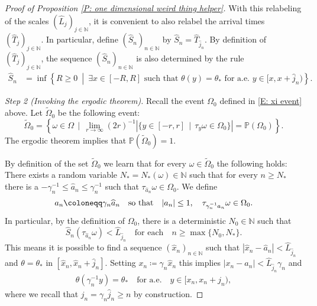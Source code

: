 \documentclass[12pt]{amsart}
\newcommand{\N}{\mathbb{N}}
\begin{document}
\begin{proof}[Proof of Proposition \ref{P: one dimensional weird thing helper}]
With this relabeling of the scales $( \widehat{L}_{j})_{j \in \mathbb{N}}$, it is convenient to also relabel the arrival times $( \widehat{T}_{j})_{j \in \mathbb{N}}$. In particular, define $( \widehat{S}_{n})_{n \in \mathbb{N}}$ by $ \widehat{S}_{n} = \widehat{T}_{\widehat{j}_{n}}$. By definition of $( \widehat{T}_{j} )_{j \in \mathbb{N}}$, the sequence $( \widehat{S}_{n})_{n \in \mathbb{N}}$ is also determined by the rule
	\begin{align} \label{E: arrival time thing}
		\widehat{S}_{n} &= \inf \left\{ R \geq 0 ~ \middle| ~  \exists x \in [-R,R] \, \, \text{such that} \, \, \theta(y) = \theta_{*} \, \,  \text{for a.e.} \, \, y \in [x, x + \widehat{j}_{n}) \right\}.
	\end{align}
	
\textit{Step 2 (Invoking the ergodic theorem).} Recall the event $\Omega_{0}$ defined in \eqref{E: xi event} above. Let $\tilde{\Omega}_{0}$ be the following event:
	\begin{equation*}
		\tilde{\Omega}_{0} = \left\{ \omega \in \Omega \, \mid \,  \lim_{r \to \infty} (2r)^{-1} |\{y \in [ - r, r] \, \mid \, \tau_{y} \omega \in \Omega_0 \}| = \mathbb{P}(\Omega_{0}) \right\}.
	\end{equation*}
The ergodic theorem implies that $\mathbb{P}(\tilde{\Omega}_{0}) = 1$.

By definition of the set $ \tilde\Omega_0 $ we learn that for every $ \omega \in \tilde\Omega_0 $ the following holds: There exists a random variable $ N_* = N_* ( \omega ) \in \mathbb{N}$ such that for every $ n \geq N_* $ there is a $ - \gamma_n^{-1} \leq \widehat{a}_n \leq \gamma_n^{-1} $ such that $ \tau_{ \widehat{a}_n } \omega \in \Omega_0 $. We define
%
\begin{align*}
a_n \coloneqq \gamma_n \widehat{a}_n
\quad { \rm so ~ that } \quad
| a_n | \leq 1,
\quad
\tau_{ \gamma_n^{-1} a_n } \omega \in \Omega_0.
\end{align*}
%
In particular, by the definition of $\Omega_{0}$, there is a deterministic $N_{0} \in \mathbb{N}$ such that 
	\begin{equation*}
		\widehat{S}_{n}(\tau_{\widehat{a}_{n}} \omega) < \widehat{L}_{\widehat{j}_{n}} \quad \text{for each} \quad n \geq \max\{ N_{0},N_{*}\} .
	\end{equation*}
This means it is possible to find a sequence $ ( \widehat{x}_n )_{ n \in \N } $ such that $ | \widehat{x}_n - \widehat{a}_{n} | < \widehat{L}_{ \widehat{j}_n } $ and $ \theta = \theta_* $ in $ [ \widehat{x}_n , \widehat{x}_n + \widehat{ j }_n ] $. Setting $ x_n \coloneqq \gamma_n \widehat{x}_n $ this implies $ | x_n - a_n | < \widehat{L}_{ \widehat{j}_n } \gamma_n $ and
%
\begin{align*}
	\theta(\gamma_n^{-1} y) = \theta_{*} \quad \text{for a.e.} \quad y \in [ x_{n}, x_{n} + j_{n}),
\end{align*}
%
where we recall that $ j_n = \gamma_{n} \widehat{j}_{n} \geq n $ by construction. 


\end{proof}
\end{document}
